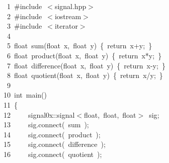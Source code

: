 \documentclass[9pt,onside,a4paper]{article}
\newcommand{\hlstd}[1]{\textcolor[rgb]{0.2,0,0.4}{#1}}
\newcommand{\hlppc}[1]{\textcolor[rgb]{0.33,0.45,0.69}{#1}}
\newcommand{\hlopt}[1]{\textcolor[rgb]{0.33,0.33,0.33}{#1}}
\newcommand{\hllin}[1]{\textcolor[rgb]{0.6,0.6,0.6}{#1}}
\newcommand{\hlkwa}[1]{\textcolor[rgb]{1,0.19,0.19}{#1}}
\newcommand{\hlkwb}[1]{\textcolor[rgb]{0.96,0.55,0.14}{#1}}
\newcommand{\hlkwd}[1]{\textcolor[rgb]{0.82,0.11,0.93}{#1}}
\begin{document}
\noindent
\ttfamily
\hlstd{}\hllin{\ \ \ \ 1\ }\hlppc{\#include\ $<$signal.hpp$>$}\\
\hllin{\ \ \ \ 2\ }\hlstd{}\hlppc{\#include\ $<$iostream$>$}\\
\hllin{\ \ \ \ 3\ }\hlstd{}\hlppc{\#include\ $<$iterator$>$}\\
\hllin{\ \ \ \ 4\ }\hlstd{}\\
\hllin{\ \ \ \ 5\ }\hlkwb{float\ }\hlstd{}\hlkwd{sum}\hlstd{}\hlopt{(}\hlstd{}\hlkwb{float\ }\hlstd{x}\hlopt{,\ }\hlstd{}\hlkwb{float\ }\hlstd{y}\hlopt{)\ \{\ }\hlstd{}\hlkwa{return\ }\hlstd{x}\hlopt{+}\hlstd{y}\hlopt{;\ \}}\\
\hllin{\ \ \ \ 6\ }\hlstd{}\hlkwb{float\ }\hlstd{}\hlkwd{product}\hlstd{}\hlopt{(}\hlstd{}\hlkwb{float\ }\hlstd{x}\hlopt{,\ }\hlstd{}\hlkwb{float\ }\hlstd{y}\hlopt{)\ \{\ }\hlstd{}\hlkwa{return\ }\hlstd{x}\hlopt{{*}}\hlstd{y}\hlopt{;\ \}}\\
\hllin{\ \ \ \ 7\ }\hlstd{}\hlkwb{float\ }\hlstd{}\hlkwd{difference}\hlstd{}\hlopt{(}\hlstd{}\hlkwb{float\ }\hlstd{x}\hlopt{,\ }\hlstd{}\hlkwb{float\ }\hlstd{y}\hlopt{)\ \{\ }\hlstd{}\hlkwa{return\ }\hlstd{x}\hlopt{{-}}\hlstd{y}\hlopt{;\ \}}\\
\hllin{\ \ \ \ 8\ }\hlstd{}\hlkwb{float\ }\hlstd{}\hlkwd{quotient}\hlstd{}\hlopt{(}\hlstd{}\hlkwb{float\ }\hlstd{x}\hlopt{,\ }\hlstd{}\hlkwb{float\ }\hlstd{y}\hlopt{)\ \{\ }\hlstd{}\hlkwa{return\ }\hlstd{x}\hlopt{/}\hlstd{y}\hlopt{;\ \}}\\
\hllin{\ \ \ \ 9\ }\hlstd{}\\
\hllin{\ \ \ 10\ }\hlkwb{int\ }\hlstd{}\hlkwd{main}\hlstd{}\hlopt{()}\\
\hllin{\ \ \ 11\ }\hlstd{}\hlopt{\{}\\
\hllin{\ \ \ 12\ }\hlstd{}\hlstd{\ \ \ \ }\hlstd{signal0x}\hlopt{::}\hlstd{signal}\hlopt{$<$}\hlstd{}\hlkwb{float}\hlstd{}\hlopt{,\ }\hlstd{}\hlkwb{float}\hlstd{}\hlopt{,\ }\hlstd{}\hlkwb{float}\hlstd{}\hlopt{$>$\ }\hlstd{sig}\hlopt{;}\\
\hllin{\ \ \ 13\ }\hlstd{}\hlstd{\ \ \ \ }\hlstd{sig}\hlopt{.}\hlstd{}\hlkwd{connect}\hlstd{}\hlopt{(\ }\hlstd{sum\ }\hlopt{);}\\
\hllin{\ \ \ 14\ }\hlstd{}\hlstd{\ \ \ \ }\hlstd{sig}\hlopt{.}\hlstd{}\hlkwd{connect}\hlstd{}\hlopt{(\ }\hlstd{product\ }\hlopt{);}\\
\hllin{\ \ \ 15\ }\hlstd{}\hlstd{\ \ \ \ }\hlstd{sig}\hlopt{.}\hlstd{}\hlkwd{connect}\hlstd{}\hlopt{(\ }\hlstd{difference\ }\hlopt{);}\\
\hllin{\ \ \ 16\ }\hlstd{}\hlstd{\ \ \ \ }\hlstd{sig}\hlopt{.}\hlstd{}\hlkwd{connect}\hlstd{}\hlopt{(\ }\hlstd{quotient\ }\hlopt{);}\\
\end{document}
